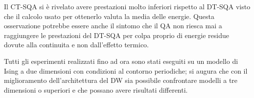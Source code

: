 Il CT-SQA si è rivelato avere prestazioni molto inferiori rispetto al DT-SQA visto che il calcolo usato per ottenerlo valuta la media delle energie. Questa osservazione potrebbe essere anche il sintomo che il QA non riesca mai a raggiungere le prestazioni del DT-SQA per colpa proprio di energie residue dovute alla continuita e non dall'effetto termico.

Tutti gli esperimenti realizzati fino ad ora sono stati eseguiti su un modello di Ising a due dimensioni con condizioni al contorno periodiche; si augura che con il miglioramento dell'architettura del DW sia possibile confrontare modelli a tre dimensioni o superiori e che possano avere risultati differenti.





